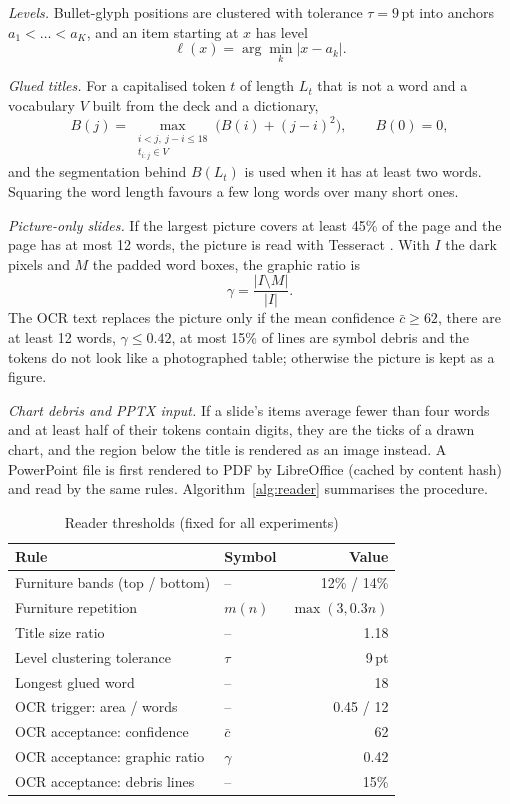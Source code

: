 \documentclass[conference]{IEEEtran}
\begin{document}
\textit{Levels.} Bullet-glyph positions are clustered with tolerance $\tau=9$\,pt into anchors $a_1<\dots<a_K$, and an item
starting at $x$ has level
\begin{equation}
\ell(x)=\arg\min_{k}|x-a_k|.
\end{equation}

\textit{Glued titles.} For a capitalised token $t$ of length $L_t$ that is not a word and a vocabulary $V$ built from the
deck and a dictionary,
\begin{equation}
B(j)=\max_{\substack{i<j,\ j-i\le 18\\ t_{i:j}\in V}}\bigl(B(i)+(j-i)^2\bigr),\qquad B(0)=0,
\label{eq:dp}
\end{equation}
and the segmentation behind $B(L_t)$ is used when it has at least two words. Squaring the word length favours a few long
words over many short ones.

\textit{Picture-only slides.} If the largest picture covers at least 45\% of the page and the page has at most 12 words,
the picture is read with Tesseract \cite{smith2007}. With $I$ the dark pixels and $M$ the padded word boxes, the graphic
ratio is
\begin{equation}
\gamma=\frac{|I\setminus M|}{|I|}.
\end{equation}
The OCR text replaces the picture only if the mean confidence $\bar c\ge 62$, there are at least 12 words, $\gamma\le 0.42$,
at most 15\% of lines are symbol debris and the tokens do not look like a photographed table; otherwise the picture is
kept as a figure.

\textit{Chart debris and PPTX input.} If a slide's items average fewer than four words and at least half of their tokens
contain digits, they are the ticks of a drawn chart, and the region below the title is rendered as an image instead.
A PowerPoint file is first rendered to PDF by LibreOffice (cached by content hash) and read by the same rules.
Algorithm~\ref{alg:reader} summarises the procedure.

\begin{table}[H]
\centering
\caption{Reader thresholds (fixed for all experiments)}
\label{tab:reader}
\begin{tabular}{llr}
\toprule
Rule & Symbol & Value \\
\midrule
Furniture bands (top / bottom) & -- & 12\% / 14\% \\
Furniture repetition & $m(n)$ & $\max(3,0.3n)$ \\
Title size ratio & -- & 1.18 \\
Level clustering tolerance & $\tau$ & 9\,pt \\
Longest glued word & -- & 18 \\
OCR trigger: area / words & -- & 0.45 / 12 \\
OCR acceptance: confidence & $\bar c$ & 62 \\
OCR acceptance: graphic ratio & $\gamma$ & 0.42 \\
OCR acceptance: debris lines & -- & 15\% \\
\bottomrule
\end{tabular}
\end{table}
\end{document}
